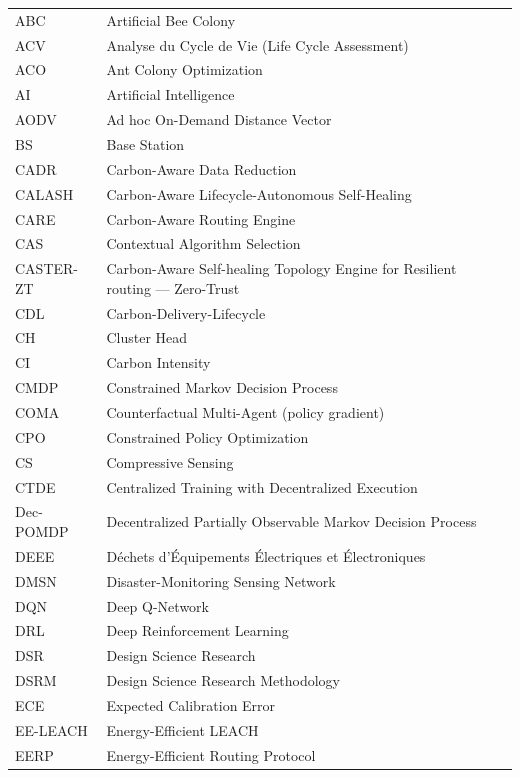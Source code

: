\begin{longtable}{lp{5in}}
ABC        & Artificial Bee Colony\\
ACV        & Analyse du Cycle de Vie (Life Cycle Assessment)\\
ACO        & Ant Colony Optimization\\
AI         & Artificial Intelligence\\
AODV       & Ad hoc On-Demand Distance Vector\\
BS         & Base Station\\
CADR       & Carbon-Aware Data Reduction\\
CALASH     & Carbon-Aware Lifecycle-Autonomous Self-Healing\\
CARE       & Carbon-Aware Routing Engine\\
CAS        & Contextual Algorithm Selection\\
CASTER-ZT  & Carbon-Aware Self-healing Topology Engine for Resilient routing --- Zero-Trust\\
CDL        & Carbon-Delivery-Lifecycle\\
CH         & Cluster Head\\
CI         & Carbon Intensity\\
CMDP       & Constrained Markov Decision Process\\
COMA       & Counterfactual Multi-Agent (policy gradient)\\
CPO        & Constrained Policy Optimization\\
CS         & Compressive Sensing\\
CTDE       & Centralized Training with Decentralized Execution\\
Dec-POMDP  & Decentralized Partially Observable Markov Decision Process\\
DEEE       & Déchets d'Équipements Électriques et Électroniques\\
DMSN       & Disaster-Monitoring Sensing Network\\
DQN        & Deep Q-Network\\
DRL        & Deep Reinforcement Learning\\
DSR        & Design Science Research\\
DSRM       & Design Science Research Methodology\\
ECE        & Expected Calibration Error\\
EE-LEACH   & Energy-Efficient LEACH\\
EERP       & Energy-Efficient Routing Protocol\\

\end{longtable}
